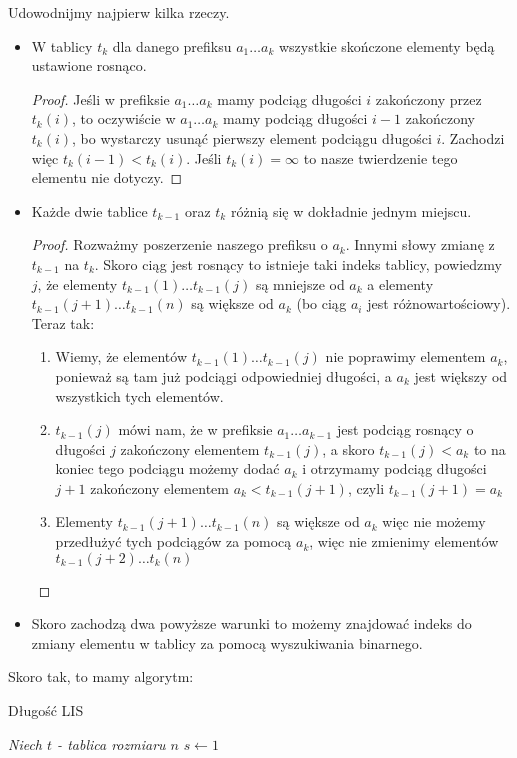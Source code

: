 \documentclass[a4paper]{article}
\begin{document}
Udowodnijmy najpierw kilka rzeczy.
\begin{itemize}
\item W tablicy $t_k$ dla danego prefiksu $a_1 \dots a_k$ wszystkie skończone elementy będą ustawione rosnąco.
\begin{proof}
Jeśli w prefiksie $a_1\dots a_k$ mamy podciąg długości $i$ zakończony przez  $t_k(i)$, to oczywiście w $a_1\dots a_k$ mamy podciąg długości $i-1$ zakończony $t_{k}(i)$, bo wystarczy usunąć pierwszy element podciągu długości $i$. Zachodzi więc $t_{k}(i-1)< t_{k}(i)$. Jeśli $t_k(i)=\infty$ to nasze twierdzenie tego elementu nie dotyczy.
\end{proof}
\item Każde dwie tablice $t_{k-1}$ oraz $t_k$ różnią się w dokładnie jednym miejscu.
\begin{proof}
Rozważmy poszerzenie naszego prefiksu o $a_k$. Innymi słowy zmianę z $t_{k-1}$ na $t_k$. Skoro ciąg jest rosnący to istnieje taki indeks tablicy, powiedzmy $j$, że elementy $t_{k-1}(1)\dots t_{k-1}(j)$ są mniejsze od $a_k$ a elementy $t_{k-1}(j+1)\dots t_{k-1}(n)$ są większe od $a_k$ (bo ciąg $a_i$ jest różnowartościowy). Teraz tak:
\begin{enumerate}
\item Wiemy, że elementów $t_{k-1}(1)\dots t_{k-1}(j)$ nie poprawimy elementem $a_k$, ponieważ są tam już podciągi odpowiedniej długości, a $a_k$ jest większy od wszystkich tych elementów.
\item $t_{k-1}(j)$ mówi nam, że w prefiksie $a_1\dots a_{k-1}$ jest podciąg rosnący o długości $j$ zakończony elementem $t_{k-1}(j)$, a skoro $t_{k-1}(j)< a_k$ to na koniec tego podciągu możemy dodać $a_k$ i otrzymamy podciąg długości $j+1$ zakończony elementem $a_k<t_{k-1}(j+1)$, czyli $t_{k-1}(j+1)=a_k$
\item Elementy $t_{k-1}(j+1) \dots t_{k-1}(n)$ są większe od $a_k$ więc nie możemy przedłużyć tych podciągów za pomocą $a_k$, więc nie zmienimy elementów $t_{k-1}(j+2)\dots t_{k}(n)$
\end{enumerate}
\end{proof} 
\item Skoro zachodzą dwa powyższe warunki to możemy znajdować indeks do zmiany elementu w tablicy za pomocą wyszukiwania binarnego.
\end{itemize}
Skoro tak, to mamy algorytm:\\
\begin{algorithm}[H]
\caption{Długość LIS}
\BlankLine
\emph{Niech $t$ - tablica rozmiaru $n$}\;
\emph{$s\leftarrow 1$}\;

\end{algorithm}
\end{document}
